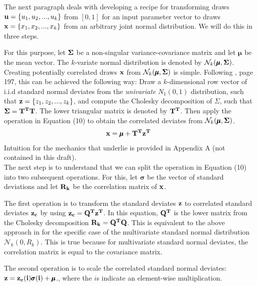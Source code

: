 \documentclass[a4paper,12pt]{article}
\begin{document}
\noindent
The next paragraph deals with developing a recipe for transforming draws $\bold{u} = \{u_1, u_2, ..., u_k\}$ from $[0,1]$ for an input parameter vector to draws $\bold{x} = \{x_1, x_2, ..., x_k\}$ from an arbitrary joint normal distribution. We will do this in three steps. 

For this purpose, let $\bold{\Sigma}$ be a non-singular variance-covariance matrix and let $\pmb{\mu}$ be the mean vector. The $k$-variate normal distribution is denoted by $\mathcal{N}_k(\pmb{\mu}, \bold{\Sigma})$. \\

\noindent
Creating potentially correlated draws $\bold{x}$ from $\mathcal{N}_k(\pmb{\mu}, \bold{\Sigma})$ is simple. Following \cite{gentle2006random}, page 197, this can be achieved the following way: Draw a $k$-dimensional row vector of i.i.d standard normal deviates from the \textit{univariate} $N_1(0,1)$ distribution, such that  $\bold{z} = \{z_1, z_2, ..., z_k\}$, and compute the Cholesky decomposition of $\Sigma$, such that $\bold{\Sigma} = \bold{T^T T}$. The lower triangular matrix is denoted by $\bold{T^T}$. Then apply the operation in Equation (10) to obtain the correlated deviates from $\mathcal{N}_k(\pmb{\mu}, \bold{\Sigma})$.
\begin{align}
\bold{x} = \pmb{\mu} + \bold{T^T z^T} 
\end{align}
Intuition for the mechanics  that underlie is provided in Appendix A (not contained in this draft). \\

\noindent
The next step is to understand that we can split the operation in Equation (10) into two subsequent operations. For this, let $\pmb{\sigma}$ be the vector of standard deviations and let $\bold{R_k}$ be the correlation matrix of $\bold{x}$.

The first operation is to transform the standard deviates $\bold{z}$ to correlated standard deviates $\bold{z_c}$ by using $\bold{z_c}=\bold{Q^T z^T}$. In this equation, $\bold{Q^T}$ is the lower matrix from the Cholesky decomposition $\bold{R_k}=\bold{Q^T Q}$. This is equivalent to the above approach in \cite{gentle2006random} for the specific case of the multivariate standard normal distribution $\mathcal{N}_k(0, R_k)$. This is true because for multivariate standard normal deviates, the correlation matrix is equal to the covariance matrix.

The second operation is to scale the correlated standard normal deviates: $\bold{z}=\bold{z_c(i)}\pmb{\sigma}\bold{(i)} + \pmb{\mu}$., where the $i$s indicate an element-wise multiplication.\\
\end{document}
